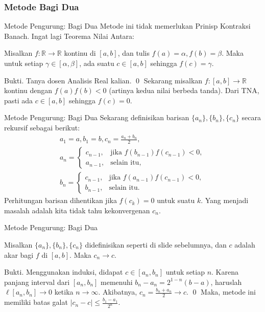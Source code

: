 \documentclass[xcolor={dvipsnames}, 9pt]{beamer}
\begin{document}
	\subsubsection{Metode Bagi Dua}
	\begin{frame}{Metode Pengurung: Bagi Dua}
		Metode ini tidak memerlukan Prinisp Kontraksi Banach. Ingat lagi Teorema Nilai Antara:
		\begin{theorem}
			Misalkan $f:\mathbb{R}\to\mathbb{R}$ kontinu di $[a,b]$, dan tulis $f(a) = \alpha, f(b) = \beta$. Maka untuk setiap $\gamma\in[\alpha,\beta]$, ada suatu $c\in [a,b]$ sehingga $f(c) = \gamma$.
		\end{theorem}
		Bukti. Tanya dosen Analisis Real kalian. \qed \newline
		Sekarang misalkan $f:[a,b]\to\mathbb{R}$ kontinu dengan $f(a)f(b)<0$ (artinya kedua nilai berbeda tanda). Dari TNA, pasti ada $c\in[a,b]$ sehingga $f(c)=0$.
	\end{frame}
	\begin{frame}{Metode Pengurung: Bagi Dua}
		Sekarang definisikan barisan $\{a_n\},\{b_n\},\{c_n\}$ secara rekursif sebagai berikut:
		\begin{gather*}
			a_1 = a, b_1 = b, c_n = \frac{a_n+b_n}{2},\\
			a_n = \begin{cases}
				c_{n-1}, & \text{jika } f(b_{n-1})f(c_{n-1})<0, \\
				a_{n-1}, & \text{selain itu},
			\end{cases}\\
			b_n = \begin{cases}
				c_{n-1}, & \text{jika } f(a_{n-1})f(c_{n-1})<0, \\
				b_{n-1}, & \text{selain itu}.
			\end{cases}
		\end{gather*}
		Perhitungan barisan dihentikan jika $f(c_k)=0$ untuk suatu $k$. \newline
		Yang menjadi masalah adalah kita tidak tahu kekonvergenan $c_n$.
	\end{frame}
	\begin{frame}{Metode Pengurung: Bagi Dua}
		\begin{lemma}
			Misalkan $\{a_n\},\{b_n\},\{c_n\}$ didefinisikan seperti di slide sebelumnya, dan $c$ adalah akar bagi $f$ di $[a,b]$. Maka $c_n\to c$.
		\end{lemma}
		Bukti. Menggunakan induksi, didapat $c\in[a_n,b_n]$ untuk setiap $n$. Karena panjang interval dari $[a_n,b_n]$ memenuhi $b_n-a_n = 2^{1-n}(b-a)$, haruslah $\ell[a_n,b_n] \to 0$ ketika $n\to\infty$. Akibatnya, $c_n = \frac{b_n+a_n}{2} \to c$. \qed \newline
		Maka, metode ini memiliki batas galat $|c_n-c|\leq \frac{b_1-a_1}{2^n}$.
	\end{frame}
\end{document}
